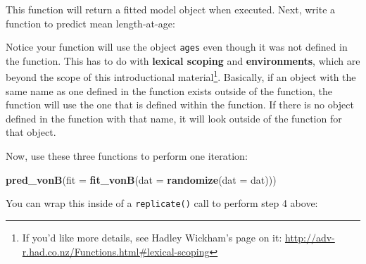 \documentclass[]{book}
\newenvironment{Shaded}{\begin{snugshade}}{\end{snugshade}}
\newcommand{\KeywordTok}[1]{\textcolor[rgb]{0.13,0.29,0.53}{\textbf{#1}}}
\newcommand{\DataTypeTok}[1]{\textcolor[rgb]{0.13,0.29,0.53}{#1}}
\newcommand{\DecValTok}[1]{\textcolor[rgb]{0.00,0.00,0.81}{#1}}
\newcommand{\StringTok}[1]{\textcolor[rgb]{0.31,0.60,0.02}{#1}}
\newcommand{\CommentTok}[1]{\textcolor[rgb]{0.56,0.35,0.01}{\textit{#1}}}
\newcommand{\ControlFlowTok}[1]{\textcolor[rgb]{0.13,0.29,0.53}{\textbf{#1}}}
\newcommand{\OperatorTok}[1]{\textcolor[rgb]{0.81,0.36,0.00}{\textbf{#1}}}
\newcommand{\NormalTok}[1]{#1}
\let\rmarkdownfootnote\footnote%
\def\footnote{\protect\rmarkdownfootnote}
\theoremstyle{definition}
\theoremstyle{definition}
\theoremstyle{definition}
\theoremstyle{remark}
\begin{document}
This function will return a fitted model object when executed. Next,
write a function to predict mean length-at-age:

\begin{Shaded}
\end{Shaded}

Notice your function will use the object \texttt{ages} even though it
was not defined in the function. This has to do with \textbf{lexical
scoping} and \textbf{environments}, which are beyond the scope of this
introductional material\footnote{If you'd like more details, see Hadley
  Wickham's page on it:
  \url{http://adv-r.had.co.nz/Functions.html\#lexical-scoping}}.
Basically, if an object with the same name as one defined in the
function exists outside of the function, the function will use the one
that is defined within the function. If there is no object defined in
the function with that name, it will look outside of the function for
that object.

Now, use these three functions to perform one iteration:

\begin{Shaded}
\begin{Highlighting}[]
\KeywordTok{pred_vonB}\NormalTok{(}\DataTypeTok{fit =} \KeywordTok{fit_vonB}\NormalTok{(}\DataTypeTok{dat =} \KeywordTok{randomize}\NormalTok{(}\DataTypeTok{dat =}\NormalTok{ dat)))}
\end{Highlighting}
\end{Shaded}

You can wrap this inside of a \texttt{replicate()} call to perform step
4 above:
\end{document}
